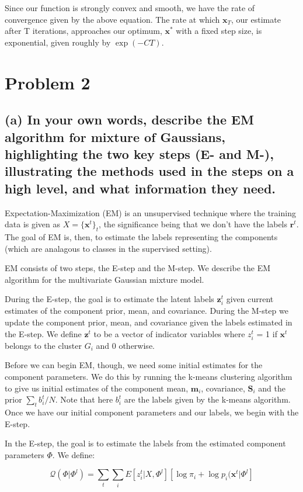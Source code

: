 \documentclass{article}
\begin{document}
Since our function is strongly convex and smooth, we have the rate of convergence given by the above equation.  The rate at which $\mathbf{x}_T$, our estimate after T iterations, approaches our optimum, $\mathbf{x}^*$ with a fixed step size, is exponential, given roughly by $\exp(-CT)$.

\section{Problem 2}

\subsection{(a) In your own words, describe the EM algorithm for mixture of Gaussians, highlighting the two key steps (E- and M-), illustrating the methods used in the steps on a high level, and what information they need.}

Expectation-Maximization (EM) is an unsupervised technique where the training data is given as $X = \{\mathbf{x}^t\}_t$, the significance being that we don't have the labels $\mathbf{r}^t$.  The goal of EM is, then, to estimate the labels representing the components (which are analagous to classes in the supervised setting).

EM consists of two steps, the E-step and the M-step.  We describe the EM algorithm for the multivariate Gaussian mixture model.

During the E-step, the goal is to estimate the latent labels $\mathbf{z}_i^t$ given current estimates of the component prior, mean, and covariance.  During the M-step we update the component prior, mean, and covariance given the labels estimated in the E-step.  We define $\mathbf{z}^t$ to be a vector of indicator variables where $z_i^t$ = 1 if $\mathbf{x}^t$ belongs to the cluster $G_i$ and 0 otherwise.

Before we can begin EM, though, we need some initial estimates for the component parameters.  We do this by running the k-means clustering algorithm to give us initial estimates of the component mean, $\mathbf{m}_i$, covariance, $\mathbf{S}_i$ and the prior $\sum_tb_i^t/N$.  Note that here $b_i^t$ are the labels given by the k-means algorithm.  Once we have our initial component parameters and our labels, we begin with the E-step.

In the E-step, the goal is to estimate the labels from the estimated component parameters $\Phi$.  We define:

\begin{equation}
\mathcal{Q} ( \Phi | \Phi^l ) = \sum\limits_t \sum\limits_i E [ z_i^t | X, \Phi^l ] [ \log \pi_i + \log p_i ( \mathbf{x}^t | \Phi^l]
\end{equation}
\end{document}
